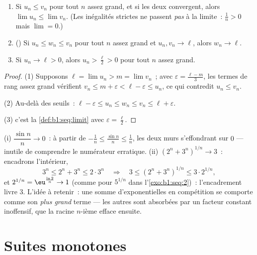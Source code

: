 \begin{theorem}\label{thm:b1:seq:order}
\begin{enumerate}
  \item Si $u_n \leq v_n$ pour tout $n$ assez grand, et si les deux
        convergent, alors $\lim u_n \leq \lim v_n$. (Les inégalités
        strictes ne passent \emph{pas} à la limite~: $\frac 1n > 0$
        mais $\lim = 0$.)
  \item () Si
        $u_n \leq w_n \leq v_n$ pour tout $n$ assez grand et $u_n,
        v_n \to \ell$, alors $w_n \to \ell$.
  \item Si $u_n \to \ell > 0$, alors $u_n > \frac\ell2 > 0$ pour tout
        $n$ assez grand.
\end{enumerate}
\end{theorem}

\begin{proof}
(1) Supposons $\ell = \lim u_n > m = \lim v_n$~; avec $\varepsilon =
\frac{\ell - m}{3}$, les termes de rang assez grand vérifient $v_n
\leq m + \varepsilon < \ell - \varepsilon \leq u_n$, ce qui contredit
$u_n \leq v_n$.

(2) Au-delà des seuils~: $\ell - \varepsilon \leq u_n \leq w_n \leq
v_n \leq \ell + \varepsilon$.

(3) c'est la \cref{def:b1:seq:limit} avec $\varepsilon = \frac\ell2$.
\end{proof}

\begin{example}\label{ex:b1:seq:squeezes}
(i) $\dfrac{\sin n}{n} \to 0$~: à partir de $-\frac1n \leq
\frac{\sin n}{n} \leq \frac1n$, les deux murs s'effondrant sur $0$
--- inutile de comprendre le numérateur erratique. (ii) $(2^n +
3^n)^{1/n} \to 3$~: encadrons l'intérieur,
\[
3^n \leq 2^n + 3^n \leq 2\cdot3^n
\quad\Longrightarrow\quad
3 \leq (2^n + 3^n)^{1/n} \leq 3\cdot 2^{1/n} ,
\]
et $2^{1/n} = \eu^{\frac{\ln 2}{n}} \to 1$ (comme pour $5^{1/n}$ dans
l'\cref{exo:b1:seq:2})~: l'encadrement livre $3$. L'idée à
retenir~: une somme d'exponentielles en compétition se comporte comme
son \emph{plus grand} terme --- les autres sont absorbées par un
facteur constant inoffensif, que la racine $n$-ième efface ensuite.
\end{example}

\section{Suites monotones}

